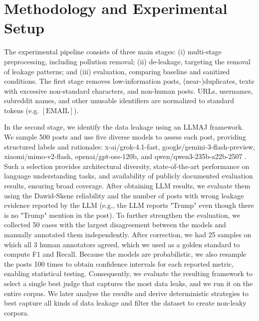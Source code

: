 \documentclass[11pt]{article}
\begin{document}
\section{Methodology and Experimental Setup}
The experimental pipeline consists of three main stages: (i) multi-stage preprocessing, including pollution removal; (ii) de-leakage, targeting the removal of leakage patterns; and (iii) evaluation, comparing baseline and sanitized conditions. The first stage removes low-information posts, (near-)duplicates, texts with excessive non-standard characters, and non-human posts. URLs, usernames, subreddit names, and other unusable identifiers are normalized to standard tokens (e.g. $[\text{EMAIL}]$).

In the second stage, we identify the data leakage using an LLMAJ framework. We sample 500 posts and use five diverse models to assess each post, providing structured labels and rationales: x-ai/grok-4.1-fast, google/gemini-3-flash-preview, xiaomi/mimo-v2-flash, openai/gpt-oss-120b, and qwen/qwen3-235b-a22b-2507 \citep{xai_grok_4_1_fast,google_gemini_3_flash_preview,xiaomi_mimo_v2_flash,openai_gpt_oss_120b,qwen_qwen3_235b_a22b_2507}
. Such a selection provides architectural diversity, state-of-the-art performance on language understanding tasks, and availability of publicly documented evaluation results, ensuring broad coverage. After obtaining LLM results, we evaluate them using the Dawid-Skene reliability \citet{dw_original} and the number of posts with wrong leakage evidence reported by the LLM (e.g., the LLM reports "Trump" even though there is no "Trump" mention in the post). To further strengthen the evaluation, we collected 50 cases with the largest disagreement between the models and manually annotated them independently. After correction, we had 25 samples on which all 3 human annotators agreed, which we used as a golden standard to compute F1 and Recall. Because the models are probabilistic, we also resample the posts 100 times to obtain confidence intervals for each reported metric, enabling statistical testing. Consequently, we evaluate the resulting framework to select a single best judge that captures the most data leaks, and we run it on the entire corpus. We later analyse the results and derive deterministic strategies to best capture all kinds of data leakage and filter the dataset to create non-leaky corpora.
\end{document}
